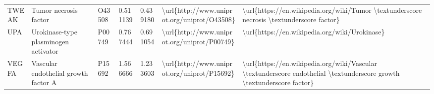 \begin{table}[]
\begin{tabular}{lllllll}
\multicolumn{1}{l|}{TWEAK}    & Tumor necrosis factor                                         & O43508  & 0.511139           & 0.439180          & \textbackslash{}url\{http://www.uniprot.org/uniprot/O43508\} & \textbackslash{}url\{https://en.wikipedia.org/wiki/Tumor \textbackslash{}textunderscore necrosis \textbackslash{}textunderscore factor\}                                                                                                                                                           \\
\multicolumn{1}{l|}{UPA}      & Urokinase-type plasminogen activator                          & P00749  & 0.767444           & 0.691054          & \textbackslash{}url\{http://www.uniprot.org/uniprot/P00749\} & \textbackslash{}url\{https://en.wikipedia.org/wiki/Urokinase\}                                                                                                                                                                                                                                     \\
\multicolumn{1}{l|}{VEGFA}    & Vascular endothelial growth factor A                          & P15692  & 1.566666           & 1.233603          & \textbackslash{}url\{http://www.uniprot.org/uniprot/P15692\} & \textbackslash{}url\{https://en.wikipedia.org/wiki/Vascular \textbackslash{}textunderscore endothelial \textbackslash{}textunderscore growth \textbackslash{}textunderscore factor\}                                                                                                              
\end{tabular}
\end{table}